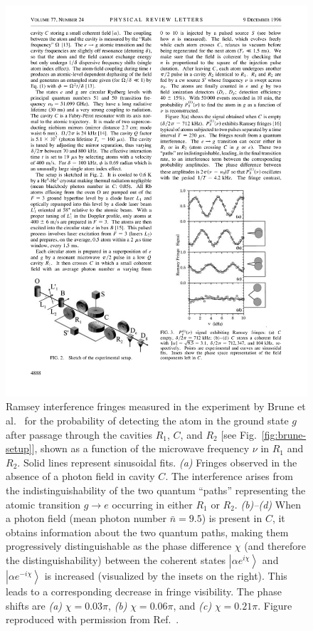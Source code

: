 \documentclass[3p,sort&compress,12pt]{elsarticle}
\newcommand{\ket}[1]{\left\vert{#1}\right\rangle}
\newcommand{\E}{\ensuremath{e}}
\newcommand{\I}{\ensuremath{i}}
\begin{document}
\begin{figure}
\centering
\includegraphics[scale=.75]{ramsey.pdf}
\caption{Ramsey interference fringes measured in the experiment by Brune et al.\
  \cite{Brune:1996:om} for the probability of detecting the atom in the ground state $g$ after passage through the cavities $R_1$, $C$, and $R_2$ [see Fig.~\ref{fig:brune-setup}], shown as a function of the microwave frequency $\nu$ in $R_1$ and $R_2$. Solid lines represent sinusoidal fits. \emph{(a)} Fringes observed in the absence of a photon field in cavity $C$. The interference arises from the indistinguishability of the two quantum ``paths'' representing the atomic transition $g\rightarrow e$ occurring in either $R_1$ or $R_2$. \emph{(b)--(d)} When a photon field (mean photon number $\bar{n}=9.5$) is present in $C$, it obtains information about the two quantum paths, making them progressively distinguishable as the phase difference $\chi$ (and therefore the distinguishability) between the coherent states $\ket{\alpha \E^{\I \chi}}$ and $\ket{\alpha \E^{-\I \chi}}$ is increased (visualized by the insets on the right). This leads to a corresponding decrease in fringe visibility. The phase shifts are \emph{(a)} $\chi=0.03\pi$, \emph{(b)} $\chi=0.06\pi$, and \emph{(c)} $\chi=0.21\pi$.  Figure reproduced with permission from Ref.~\cite{Brune:1996:om}.}
\label{fig:ramsey}
\end{figure}
\end{document}
